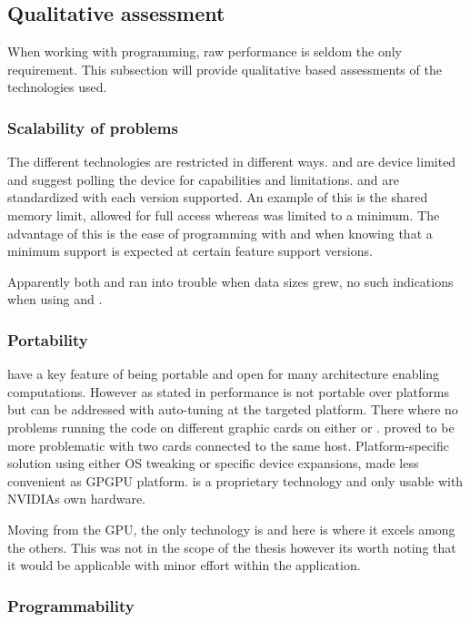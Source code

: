 \subsection{Qualitative assessment}

When working with programming, raw performance is seldom the only requirement. This subsection will provide qualitative based assessments of the technologies used.

\subsubsection{Scalability of problems}

The different technologies are restricted in different ways. {\CU} and {\OCL} are device limited and suggest polling the device for capabilities and limitations. {\DX} and {\GL} are standardized with each version supported. An example of this is the shared memory limit, {\CU} allowed for full access whereas {\DX} was limited to a minimum. The advantage of this is the ease of programming with {\DX} and {\GL} when knowing that a minimum support is expected at certain feature support versions.

Apparently both {\DX} and {\GL} ran into trouble when data sizes grew, no such indications when using {\CU} and {\OCL}.

\subsubsection{Portability}

{\OCL} have a key feature of being portable and open for many architecture enabling computations. However as stated in \cite{fang2011comprehensive, du2012cuda} performance is not portable over platforms but can be addressed with auto-tuning at the targeted platform. There where no problems running the code on different graphic cards on either {\OCL} or {\DX}. {\GL} proved to be more problematic with two cards connected to the same host. Platform-specific solution using either \gls{OS} tweaking or specific device {\GL} expansions, made {\GL} less convenient as GPGPU platform. {\CU} is a proprietary technology and only usable with NVIDIAs own hardware.

Moving from the \gls{GPU}, the only technology is {\OCL} and here is where it excels among the others. This was not in the scope of the thesis however its worth noting that it would be applicable with minor effort within the application.

\subsubsection{Programmability}

